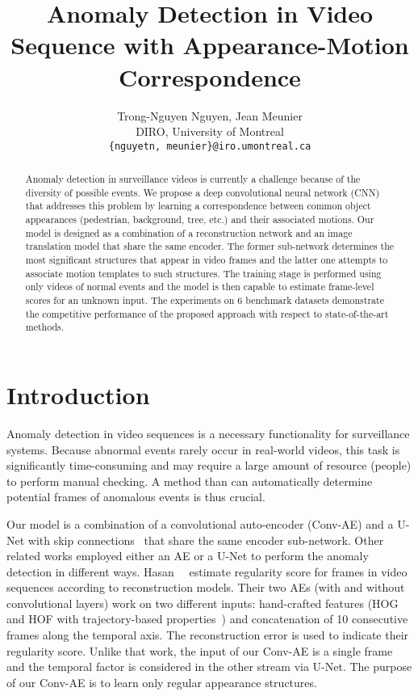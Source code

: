 \documentclass[10pt,twocolumn,letterpaper]{article}
\begin{document}
\title{Anomaly Detection in Video Sequence with Appearance-Motion Correspondence}

\author{Trong-Nguyen Nguyen, Jean Meunier\\
DIRO, University of Montreal\\
{\tt\small \{nguyetn, meunier\}@iro.umontreal.ca}
}

\maketitle
\ificcvfinal\thispagestyle{empty}\fi

\begin{abstract}
Anomaly detection in surveillance videos is currently a challenge because of the diversity of possible events. We propose a deep convolutional neural network (CNN) that addresses this problem by learning a correspondence between common object appearances (\eg pedestrian, background, tree, etc.) and their associated motions. Our model is designed as a combination of a reconstruction network and an image translation model that share the same encoder. The former sub-network determines the most significant structures that appear in video frames and the latter one attempts to associate motion templates to such structures. The training stage is performed using only videos of normal events and the model is then capable to estimate frame-level scores for an unknown input. The experiments on 6 benchmark datasets demonstrate the competitive performance of the proposed approach with respect to state-of-the-art methods.
\end{abstract}

\section{Introduction}

Anomaly detection in video sequences is a necessary functionality for surveillance systems. Because abnormal events rarely occur in real-world videos, this task is significantly time-consuming and may require a large amount of resource (\eg people) to perform manual checking. A method than can automatically determine potential frames of anomalous events is thus crucial.



Our model is a combination of a convolutional auto-encoder (Conv-AE) and a U-Net with skip connections~\cite{Olaf2015UNet} that share the same encoder sub-network. Other related works employed either an AE or a U-Net to perform the anomaly detection in different ways. Hasan~\etal~\cite{Hasan2016Learning} estimate regularity score for frames in video sequences according to reconstruction models. Their two AEs (with and without convolutional layers) work on two different inputs: hand-crafted features (HOG and HOF with trajectory-based properties~\cite{Wang2013Action}) and concatenation of 10 consecutive frames along the temporal axis. The reconstruction error is used to indicate their regularity score. Unlike that work, the input of our Conv-AE is a single frame and the temporal factor is considered in the other stream via U-Net. The purpose of our Conv-AE is to learn only regular appearance structures.
\end{document}
